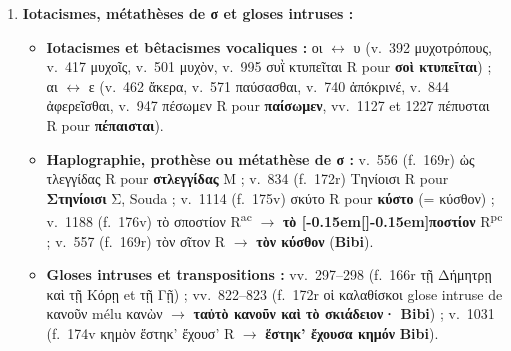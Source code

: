 \documentclass[10pt, a4paper, twoside]{book}
\renewcommand{\_}{\origunderscore\penalty0\relax}
\renewcommand{\texttt}[1]{#1}
\providecommand{\lecon}[1]{\textbf{#1}}
\providecommand{\expo}[1]{\textsuperscript{#1}}
\providecommand{\Rac}{R\expo{ac}}
\providecommand{\Rpc}{R\expo{pc}}
\providecommand{\Mon}{M}
\providecommand{\inRas}[2]{[\kern-0.15em[\text{#1}]\kern-0.15em]\text{#2}}
\begin{document}
\begin{enumerate}
\begin{itemize}
    \item \textbf{β $\leftrightarrow$ ν et β $\leftrightarrow$ θ :} v.~489 (\texttt{f.~168r}) κυνδ' \Rac{} $\to$ \lecon{κύβδ'} \Rpc{} ; v.~1017 (\texttt{f.~174v}) λάβοιμι R pour \lecon{λάθοιμι}.
    \item \textbf{μ $\leftrightarrow$ ν :} v.~50 (\texttt{f.~163r}) πρανοῦν $\to$ πράμος R (\textbf{Bibi}) ; v.~162 (\texttt{f.~164r}) ἐκεχήνεσαν $\to$ ἐχύμησαν R (\lecon{ἐκεχήνεσαν} \textbf{Bibi}).
    \item \textbf{α $\leftrightarrow$ ο et ει $\leftrightarrow$ η :} v.~179 (\texttt{f.~164v}) κοινῇ R pour \lecon{καινῇ} ; v.~1174 (\texttt{f.~176v}) κἀνακόλπασον R pour \lecon{κἀνακάλπασον} ; v.~1201 (\texttt{f.~176v}) ἀρτομουξία R pour \lecon{Ἀρταμουξία}.
    \item \textbf{ν $\leftrightarrow$ ς et -ικ $\leftrightarrow$ -οις :} v.~710 (\texttt{f.~170v}) ἥκεις τ' R pour \lecon{ἥκειν γ'} (\textbf{Bibi} ap. Photius η~88) ; v.~1198 (\texttt{f.~176v}) κ\inRas{ω}{ο}μίζεις αὐτοῖς \Rpc{} pour \lecon{(Τοξότ.) κομίζι σ' αὐτίκ'} (\textbf{Bibi}).
  \end{itemize}
  \item \textbf{Iotacismes, métathèses de σ et gloses intruses :}
  \begin{itemize}
    \item \textbf{Iotacismes et bêtacismes vocaliques :} οι $\leftrightarrow$ υ (v.~392 μυχοτρόπους, v.~417 μυχοῖς, v.~501 μυχὸν, v.~995 συῒ κτυπεῖται R pour \lecon{σοὶ κτυπεῖται}) ; αι $\leftrightarrow$ ε (v.~462 ἄκερα, v.~571 παύσασθαι, v.~740 ἀπόκρινέ, v.~844 ἀφερεῖσθαι, v.~947 πέσωμεν R pour \lecon{παίσωμεν}, vv.~1127 et 1227 πέπυσται R pour \lecon{πέπαισται}).
    \item \textbf{Haplographie, prothèse ou métathèse de σ :} v.~556 (\texttt{f.~169r}) ὡς τλεγγίδας R pour \lecon{στλεγγίδας} \Mon{} ; v.~834 (\texttt{f.~172r}) Τηνίοισι R pour \lecon{Στηνίοισι} Σ, Souda ; v.~1114 (\texttt{f.~175v}) σκύτο R pour \lecon{κύστο} (= κύσθον) ; v.~1188 (\texttt{f.~176v}) τὸ σποστίον \Rac{} $\to$ \lecon{τὸ \inRas{σ}{}ποστίον} \Rpc{} ; v.~557 (\texttt{f.~169r}) τὸν σῖτον R $\to$ \lecon{τὸν κύσθον} (\textbf{Bibi}).
    \item \textbf{Gloses intruses et transpositions :} vv.~297--298 (\texttt{f.~166r} τῇ Δήμητρῃ καὶ τῇ Κόρῃ et τῇ Γῇ) ; vv.~822--823 (\texttt{f.~172r} οἱ καλαθίσκοι glose intruse de κανοῦν mélu κανὼν $\to$ \lecon{ταὐτὸ κανοῦν καὶ τὸ σκιάδειον·} \textbf{Bibi}) ; v.~1031 (\texttt{f.~174v} κημὸν ἕστηκ' ἔχουσ' R $\to$ \lecon{ἕστηκ' ἔχουσα κημόν} \textbf{Bibi}).
  \end{itemize}
\end{enumerate}
\end{document}
